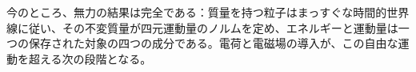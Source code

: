 \begin{classroomqa}
\end{classroomqa}

今のところ、無力の結果は完全である：質量を持つ粒子はまっすぐな時間的世界線に従い、その不変質量が四元運動量のノルムを定め、エネルギーと運動量は一つの保存された対象の四つの成分である。電荷と電磁場の導入が、この自由な運動を超える次の段階となる。
